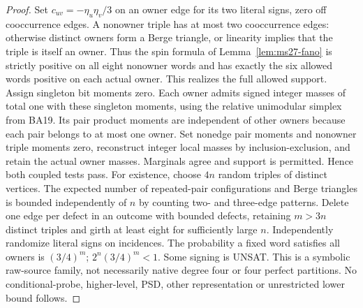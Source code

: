 \documentclass[11pt]{article}
\begin{document}
\begin{proof}
Set $c_{uv}=-\eta_u\eta_v/3$ on an owner edge for its two literal signs, zero off cooccurrence edges. A nonowner triple has at most two cooccurrence edges: otherwise distinct owners form a Berge triangle, or linearity implies that the triple is itself an owner. Thus the spin formula of Lemma~\ref{lem:ms27-fano} is strictly positive on all eight nonowner words and has exactly the six allowed words positive on each actual owner. This realizes the full allowed support. Assign singleton bit moments zero. Each owner admits signed integer masses of total one with these singleton moments, using the relative unimodular simplex from BA19. Its pair product moments are independent of other owners because each pair belongs to at most one owner. Set nonedge pair moments and nonowner triple moments zero, reconstruct integer local masses by inclusion-exclusion, and retain the actual owner masses. Marginals agree and support is permitted. Hence both coupled tests pass.
For existence, choose $4n$ random triples of distinct vertices. The expected number of repeated-pair configurations and Berge triangles is bounded independently of $n$ by counting two- and three-edge patterns. Delete one edge per defect in an outcome with bounded defects, retaining $m>3n$ distinct triples and girth at least eight for sufficiently large $n$. Independently randomize literal signs on incidences. The probability a fixed word satisfies all owners is $(3/4)^m$; $2^n(3/4)^m<1$. Some signing is UNSAT. This is a symbolic raw-source family, not necessarily native degree four or four perfect partitions. No conditional-probe, higher-level, PSD, other representation or unrestricted lower bound follows.
\end{proof}
\end{document}

